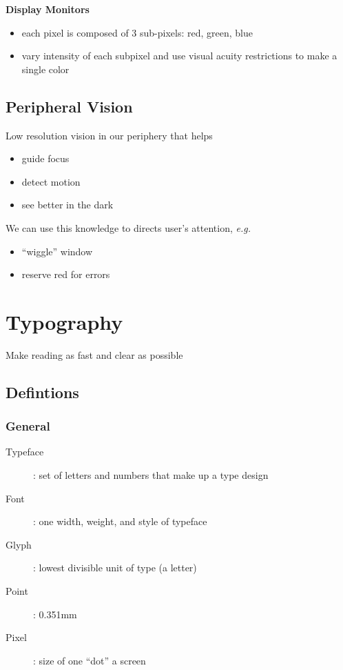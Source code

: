 \documentclass[]{article}
\theoremstyle{definition}
\begin{document}
	\textbf{Display Monitors}
	\begin{itemize}
		\item each pixel is composed of 3 sub-pixels: red, green, blue
		\item vary intensity of each subpixel and use visual acuity restrictions to make a single color
	\end{itemize}

	\subsection{Peripheral Vision}
	Low resolution vision in our periphery that helps
	\begin{itemize}
		\item guide focus
		\item detect motion
		\item see better in the dark
	\end{itemize}
	We can use this knowledge to directs user's attention, \textit{e.g.}
	\begin{itemize}
		\item ``wiggle'' window
		\item reserve red for errors
	\end{itemize}

	\section{Typography}
	Make reading as fast and clear as possible

	\subsection{Defintions}
	\subsubsection{General}
	\begin{description}
		\item[Typeface]: set of letters and numbers that make up a type design
		\item[Font]: one width, weight, and style of typeface
		\item[Glyph]: lowest divisible unit of type (a letter)
		\item[Point]: 0.351mm
		\item[Pixel]: size of one ``dot'' a screen
	\end{description}
\end{document}
